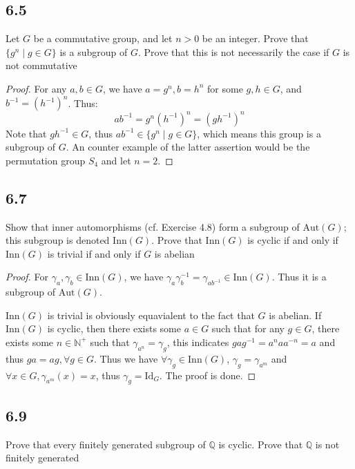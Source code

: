 \documentclass[a4paper, pdf, 12pt]{article}
\begin{document}
\subsection*{6.5}
Let $G$ be a commutative group, and let $n > 0$ be an integer. Prove that
$\{g^{n} \mid g \in G\}$ is a subgroup of $G$. Prove that this is not necessarily the case if $G$ is
not commutative
\begin{proof}
  For any $a, b\in G$, we have $a = g^{n}, b = h^{n}$ for some $g,h\in G$, and $b^{-1} = (h^{-1})^{n}$. Thus:
  $$
    ab^{-1} = g^{n} (h^{-1})^{n} = (gh^{-1})^n
  $$
  Note that $gh^{-1}\in G$, thus $ab^{-1}\in \{g^{n}\mid g\in G\}$, which means this group is a subgroup of $G$.
  An counter example of the latter assertion would be the permutation group $S_{4}$ and let $n = 2$.
\end{proof}

\subsection*{6.7}
Show that inner automorphisms (cf. Exercise 4.8) form a subgroup of
$\mbox{Aut}(G)$; this subgroup is denoted $\mbox{Inn}(G)$. Prove that $\mbox{Inn}(G)$
is cyclic if and only if $\mbox{Inn}(G)$ is trivial if and only if $G$ is abelian
\begin{proof}
  For $\gamma_{a}, \gamma_{b}\in \mbox{Inn}(G)$, we have $\gamma_{a}\gamma_{b}^{-1} = \gamma_{ab^{-1}}\in \mbox{Inn}(G)$. Thus
  it is a subgroup of $\mbox{Aut}(G)$.

  $\mbox{Inn}(G)$ is trivial is obviously equavialent to the fact that $G$ is abelian. If $\mbox{Inn}(G)$ is cyclic, then there exists
  some $a\in G$ such that for any $g\in G$, there exists some $n\in \mathbb{N}^{+}$ such that $\gamma_{a^{n}} = \gamma_{g}$, this indicates
  $gag^{-1} = a^{n}aa^{-n} = a$ and thus $ga = ag, \forall g\in G$. Thus we have $\forall \gamma_{g}\in \mbox{Inn}(G)$, $\gamma_{g}=\gamma_{a^{m}}$
  and $\forall x\in G, \gamma_{a^{m}}(x) = x$, thus $\gamma_{g} = \mbox{Id}_{G}$. The proof is done.
\end{proof}

\subsection*{6.9}
Prove that every finitely generated subgroup of $\mathbb{Q}$ is cyclic. Prove that $\mathbb{Q}$ is
not finitely generated
\end{document}
